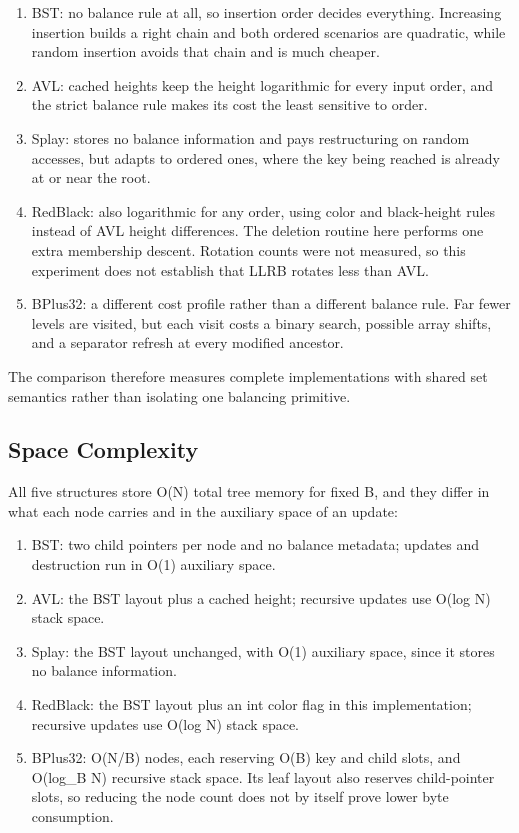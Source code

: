 \begin{enumerate}
  \item BST: no balance rule at all, so insertion order decides everything. Increasing insertion builds a right chain and both ordered scenarios are quadratic, while random insertion avoids that chain and is much cheaper.
  \item AVL: cached heights keep the height logarithmic for every input order, and the strict balance rule makes its cost the least sensitive to order.
  \item Splay: stores no balance information and pays restructuring on random accesses, but adapts to ordered ones, where the key being reached is already at or near the root.
  \item RedBlack: also logarithmic for any order, using color and black-height rules instead of AVL height differences. The deletion routine here performs one extra membership descent. Rotation counts were not measured, so this experiment does not establish that LLRB rotates less than AVL.
  \item BPlus32: a different cost profile rather than a different balance rule. Far fewer levels are visited, but each visit costs a binary search, possible array shifts, and a separator refresh at every modified ancestor.
\end{enumerate}

The comparison therefore measures complete implementations with shared set semantics rather than isolating one balancing primitive.

\subsection{Space Complexity}

All five structures store O(N) total tree memory for fixed B, and they differ in what each node carries and in the auxiliary space of an update:

\begin{enumerate}
  \item BST: two child pointers per node and no balance metadata; updates and destruction run in O(1) auxiliary space.
  \item AVL: the BST layout plus a cached height; recursive updates use O(log N) stack space.
  \item Splay: the BST layout unchanged, with O(1) auxiliary space, since it stores no balance information.
  \item RedBlack: the BST layout plus an int color flag in this implementation; recursive updates use O(log N) stack space.
  \item BPlus32: O(N/\allowbreak{}B) nodes, each reserving O(B) key and child slots, and O(log\_\allowbreak{}B N) recursive stack space. Its leaf layout also reserves child-pointer slots, so reducing the node count does not by itself prove lower byte consumption.
\end{enumerate}

